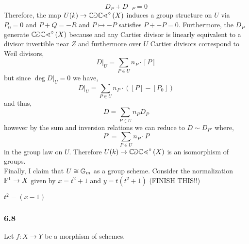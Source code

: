 \documentclass[12pt]{article}
\begin{document}
\[ D_P + D_{-P} = 0 \]
Therefore, the map $U(k) \to \CaClcirc{X}$ induces a group structure on $U$ via $P_0 = 0$ and $P + Q = -R$ and $P \mapsto -P$ satisfies $P + -P = 0$. Furthermore, the $D_P$ generate $\CaClcirc{X}$ because and any Cartier divisor is linearly equivalent to a divisor invertible near $Z$ and furthermore over $U$ Cartier divisors correspond to Weil divisors,
\[ D|_U = \sum_{P \in U} n_P \cdot [P] \]
but since $\deg{D|_U} = 0$ we have,
\[ D|_U = \sum_{P \in U} n_P \cdot ([P] - [P_0]) \]
and thus,
\[ D = \sum_{P \in U} n_P D_P \]
however by the sum and inversion relations we can reduce to $D \sim D_{P'}$ where,
\[ P' = \sum_{P \in U} n_P \cdot P \]
in the group law on $U$. Therefore $U(k) \to \CaClcirc{X}$ is an isomorphism of groups. 
\bigskip\\
Finally, I claim that $U \cong \Gm$ as a group scheme. Consider the normalization $\P^1 \to X$ given by $x = t^2  + 1$ and $y = t(t^2 + 1)$ (FINISH THIS!!)

$t^2 = (x - 1)$ 
\subsubsection{6.8}

Let $f : X \to Y$ be a morphism of schemes.
\end{document}
